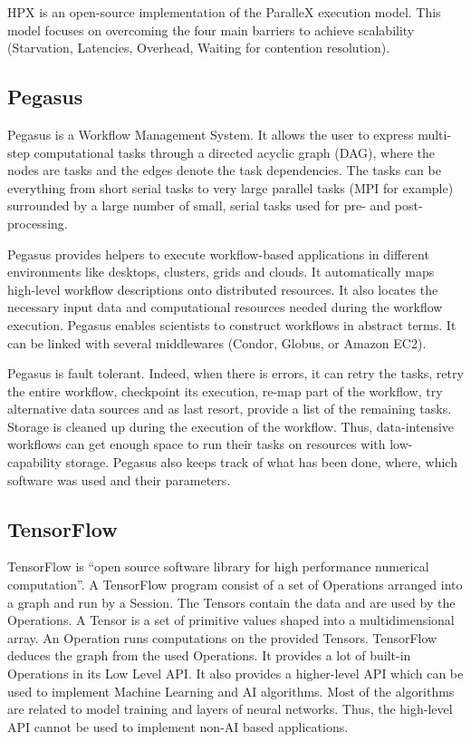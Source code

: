 HPX is an open-source implementation of the ParalleX execution model.
This model focuses on overcoming the four main barriers to achieve scalability (Starvation, Latencies, Overhead, Waiting for contention resolution).

\subsection{Pegasus}
Pegasus \cite{DSSBG2005} is a Workflow Management System.
It allows the user to express multi-step computational tasks through a directed acyclic graph (DAG), where the nodes are tasks and the edges denote the task dependencies.
The tasks can be everything  from short serial tasks to very large parallel tasks (MPI for example) surrounded by a large number of small, serial tasks used for pre- and post-processing.

Pegasus provides helpers to execute workflow-based applications in different environments like desktops, clusters, grids and clouds.
It automatically maps high-level workflow descriptions onto distributed resources.
It also locates the necessary input data and computational resources needed during the workflow execution.
Pegasus enables scientists to construct workflows in abstract terms.
It can be linked with several middlewares (Condor, Globus, or Amazon EC2).

Pegasus is fault tolerant.
Indeed, when there is errors, it can retry the tasks, retry the entire workflow, checkpoint its execution, re-map part of the workflow, try alternative data sources and as last resort, provide a list of the remaining tasks.
Storage is cleaned up during the execution of the workflow.
Thus, data-intensive workflows can get enough space to run their tasks on resources with low-capability storage.
Pegasus also keeps track of what has been done, where, which software was used and their parameters.

\subsection{TensorFlow}
TensorFlow \cite{AABBC2016} is “open source software library for high performance numerical computation”.
A TensorFlow program consist of a set of Operations arranged into a graph and run by a Session.
The Tensors contain the data and are used by the Operations.
A Tensor is a set of primitive values shaped into a multidimensional array.
An Operation runs computations on the provided Tensors.
TensorFlow deduces the graph from the used Operations.
It provides a lot of built-in Operations in its Low Level API.
It also provides a higher-level API which can be used to implement Machine Learning and AI algorithms.
Most of the algorithms are related to model training and layers of neural networks.
Thus, the high-level API cannot be used to implement non-AI based applications.

